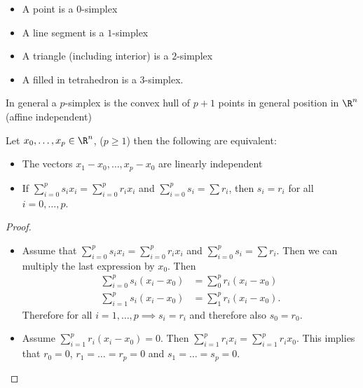 \begin{itemize}
    \item A  point is a $0$-simplex
    \item A line segment is a $1$-simplex
    \item A triangle (including interior) is a $2$-simplex
    \item A filled in tetrahedron is a $3$-simplex.
\end{itemize}
\begin{definition}[Simplex]
    In general a $p$-simplex is the convex hull of $p + 1$ points in general position in $\R^n$ (affine independent)
\end{definition}
\begin{prop}[1.1]
    Let $x_0, \ldots, x_p \in \R^{n}$, ($p \ge  1$) then the following are equivalent:
    \begin{itemize}
        \item The vectors $x_1 - x_0, \ldots, x_p - x_0$ are linearly independent
        \item If $\sum_{i=0}^{p} s_i x_i = \sum_{i=0}^{p} r_i x_i$ and $\sum_{i=0}^{p} s_i = \sum r_i$, then $s_i = r_i $ for all $i=0, \ldots, p$.
    \end{itemize}
\end{prop}
\begin{proof}
    \begin{itemize}
        \item Assume that $\sum_{i=0}^{p} s_i x_i = \sum_{i=0}^{p} r_i x_i$ and  $\sum_{i=0}^{p} s_i = \sum r_i$. Then we can multiply the last expression by $x_0$.
            Then
            \begin{align*}
                \sum_{i=0}^{p} s_i (x_i - x_0) &= \sum_{0}^{p} r_i (x_i - x_0)\\
                \sum_{i=1}^{p} s_i (x_i - x_0) &= \sum_{1}^{p} r_i (x_i - x_0)
            .\end{align*}
            Therefore for all $i = 1, \ldots, p \implies s_i = r_i$ and therefore also $s_0 = r_0$.

        \item Assume $\sum_{i=1}^{p} r_i (x_i - x_0) = 0$.
            Then $\sum_{i=1}^{p} r_i x_i = \sum_{i=1}^{p} r_i x_0$.
            This implies that $r_0 = 0$, $r_1 = \ldots = r_p = 0$ and $s_1 = \ldots = s_p = 0$.
    \end{itemize}
\end{proof}


\hr

